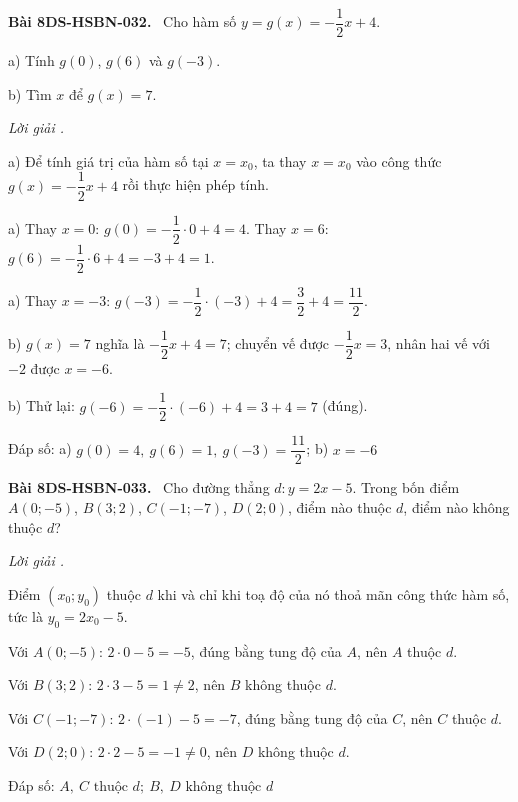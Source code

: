 \documentclass[12pt,a4paper]{article}
\newenvironment{problem}[1][]{\par\medskip\noindent\textbf{Bài #1.}\ }{\par}
\newenvironment{solution}[1][]{\par\noindent\textit{Lời giải #1.}\par}{\par}
\begin{document}
\begin{problem}[8DS-HSBN-032]
Cho hàm số $y = g(x) = -\dfrac{1}{2}x + 4$.

a) Tính $g(0)$, $g(6)$ và $g(-3)$.

b) Tìm $x$ để $g(x) = 7$.

\begin{solution}
a) Để tính giá trị của hàm số tại $x = x_0$, ta thay $x = x_0$ vào công thức $g(x) = -\dfrac{1}{2}x + 4$ rồi thực hiện phép tính.

a) Thay $x = 0$: $g(0) = -\dfrac{1}{2} \cdot 0 + 4 = 4$. Thay $x = 6$: $g(6) = -\dfrac{1}{2} \cdot 6 + 4 = -3 + 4 = 1$.

a) Thay $x = -3$: $g(-3) = -\dfrac{1}{2} \cdot (-3) + 4 = \dfrac{3}{2} + 4 = \dfrac{11}{2}$.

b) $g(x) = 7$ nghĩa là $-\dfrac{1}{2}x + 4 = 7$; chuyển vế được $-\dfrac{1}{2}x = 3$, nhân hai vế với $-2$ được $x = -6$.

b) Thử lại: $g(-6) = -\dfrac{1}{2} \cdot (-6) + 4 = 3 + 4 = 7$ (đúng).

Đáp số: a) $\boxed{g(0) = 4,\ g(6) = 1,\ g(-3) = \dfrac{11}{2}}$; b) $\boxed{x = -6}$
\end{solution}
\end{problem}

\begin{problem}[8DS-HSBN-033]
Cho đường thẳng $d\colon y = 2x - 5$. Trong bốn điểm $A(0; -5)$, $B(3; 2)$, $C(-1; -7)$, $D(2; 0)$, điểm nào thuộc $d$, điểm nào không thuộc $d$?

\begin{solution}
Điểm $(x_0; y_0)$ thuộc $d$ khi và chỉ khi toạ độ của nó thoả mãn công thức hàm số, tức là $y_0 = 2x_0 - 5$.

Với $A(0; -5)$: $2 \cdot 0 - 5 = -5$, đúng bằng tung độ của $A$, nên $A$ thuộc $d$.

Với $B(3; 2)$: $2 \cdot 3 - 5 = 1 \neq 2$, nên $B$ không thuộc $d$.

Với $C(-1; -7)$: $2 \cdot (-1) - 5 = -7$, đúng bằng tung độ của $C$, nên $C$ thuộc $d$.

Với $D(2; 0)$: $2 \cdot 2 - 5 = -1 \neq 0$, nên $D$ không thuộc $d$.

Đáp số: $\boxed{A,\ C \text{ thuộc } d;\ B,\ D \text{ không thuộc } d}$
\end{solution}
\end{problem}
\end{document}
